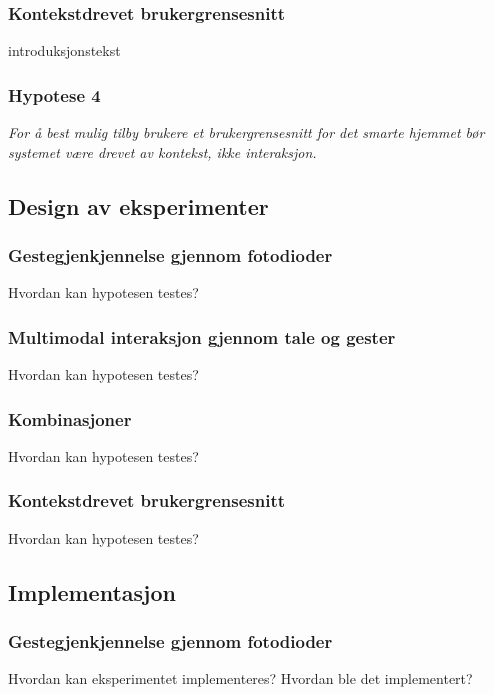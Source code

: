 \subsubsection{Kontekstdrevet brukergrensesnitt}
introduksjonstekst
\subsubsection*{Hypotese 4}
\emph{For å best mulig tilby brukere et brukergrensesnitt for det smarte hjemmet bør systemet være drevet av kontekst, ikke interaksjon.}




\subsection{Design av eksperimenter}
\subsubsection{Gestegjenkjennelse gjennom fotodioder}
{\color{red}Hvordan kan hypotesen testes?}

\subsubsection{Multimodal interaksjon gjennom tale og gester}
{\color{red}Hvordan kan hypotesen testes?}

\subsubsection{Kombinasjoner}
{\color{red}Hvordan kan hypotesen testes?}

\subsubsection{Kontekstdrevet brukergrensesnitt}
{\color{red}Hvordan kan hypotesen testes?}





\subsection{Implementasjon}
\subsubsection{Gestegjenkjennelse gjennom fotodioder}
{\color{red}Hvordan kan eksperimentet implementeres? Hvordan ble det implementert?}




